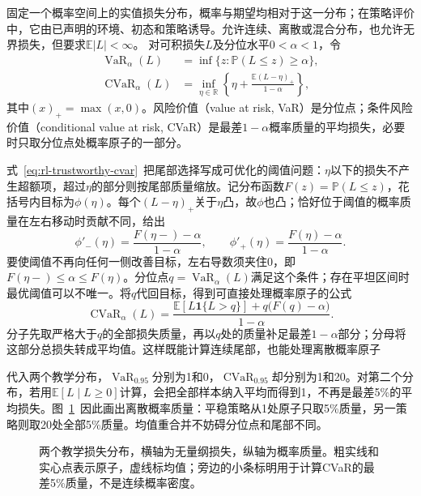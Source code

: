 \begin{definition}[损失上尾的VaR与CVaR]
  \label{def:rl-trustworthy-cvar}
  固定一个概率空间上的实值损失分布，概率与期望均相对于这一分布；在策略评价中，它由已声明的环境、初态和策略诱导。允许连续、离散或混合分布，也允许无界损失，但要求$\mathbb E|L|<\infty$。
  对可积损失$L$及分位水平$0<\alpha<1$，令
  \begin{align}
    \operatorname{VaR}_\alpha(L)
      &=\inf\{z:\mathbb P(L\leq z)\geq\alpha\}, \\
    \operatorname{CVaR}_\alpha(L)
      &=\inf_{\eta\in\mathbb R}
        \left\{\eta+\frac{\mathbb E(L-\eta)_+}{1-\alpha}\right\},
      \label{eq:rl-trustworthy-cvar}
  \end{align}
  其中$(x)_+=\max(x,0)$。风险价值（value at risk, VaR）是分位点；条件风险价值（conditional value at risk, CVaR）是最差$1-\alpha$概率质量的平均损失，必要时只取分位点处概率原子的一部分。
\end{definition}

式~\eqref{eq:rl-trustworthy-cvar}~把尾部选择写成可优化的阈值问题：$\eta$以下的损失不产生超额项，超过$\eta$的部分则按尾部质量缩放。记分布函数$F(z)=\mathbb P(L\leq z)$，花括号内目标为$\phi(\eta)$。每个$(L-\eta)_+$关于$\eta$凸，故$\phi$也凸；恰好位于阈值的概率质量在左右移动时贡献不同，给出
\[
  \phi'_-(\eta)=\frac{F(\eta-)-\alpha}{1-\alpha},
  \qquad
  \phi'_+(\eta)=\frac{F(\eta)-\alpha}{1-\alpha}.
\]
要使阈值不再向任何一侧改善目标，左右导数须夹住0，即
$F(\eta-)\leq\alpha\leq F(\eta)$。分位点$q=\operatorname{VaR}_\alpha(L)$满足这个条件；存在平坦区间时最优阈值可以不唯一。将$q$代回目标，得到可直接处理概率原子的公式
\begin{equation}
  \operatorname{CVaR}_\alpha(L)=
  \frac{\mathbb E[L\mathbf 1\{L>q\}]
       +q\bigl(F(q)-\alpha\bigr)}{1-\alpha}.
  \label{eq:rl-trustworthy-tail-mass}
\end{equation}
分子先取严格大于$q$的全部损失质量，再以$q$处的质量补足最差$1-\alpha$部分；分母将这部分总损失转成平均值。这样既能计算连续尾部，也能处理离散概率原子

代入两个教学分布，$\operatorname{VaR}_{0.95}$分别为1和0，$\operatorname{CVaR}_{0.95}$却分别为1和20。对第二个分布，若用$\mathbb E[L\mid L\geq0]$计算，会把全部样本纳入平均而得到1，不再是最差5\%的平均损失。图~\ref{fig:rl-trustworthy-loss}~因此画出离散概率质量：平稳策略从1处原子只取5\%质量，另一策略则取20处全部5\%质量。均值重合并不妨碍分位点和尾部不同。

\begin{figure}[htbp]
  \centering
  
  \caption{两个教学损失分布，横轴为无量纲损失，纵轴为概率质量。粗实线和实心点表示原子，虚线标均值；旁边的小条标明用于计算CVaR的最差5\%质量，不是连续概率密度。}
  \label{fig:rl-trustworthy-loss}
\end{figure}

